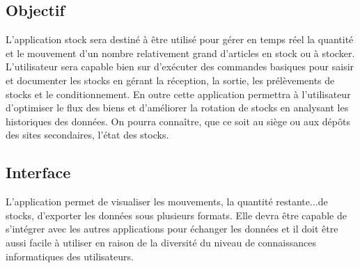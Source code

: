 	\subsection{Objectif}
	L'application stock sera destiné à être utilisé pour gérer en temps réel la quantité et le mouvement d'un nombre relativement grand d'articles en stock ou à stocker. L'utilisateur sera capable bien sur d'exécuter des commandes basiques pour saisir et documenter les stocks en gérant la réception, la sortie, les prélèvements de stocks et le conditionnement. En outre cette application permettra à l'utilisateur d'optimiser le flux des biens et d'améliorer la rotation de stocks en analysant les historiques des données. On pourra connaître, que ce soit au siège ou aux dépôts des sites secondaires, l'état des stocks.

	\subsection{Interface}
	L'application permet de visualiser les mouvements, la quantité restante...de stocks, d'exporter les données sous plusieurs formats. Elle devra être capable de s'intégrer avec les autres applications pour échanger les données et il doit être aussi facile à utiliser en raison de la diversité du niveau de connaissances informatiques des utilisateurs.

